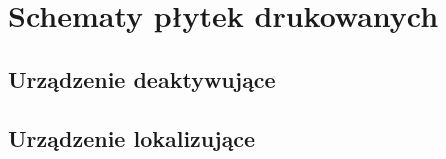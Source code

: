 \chapter{Schematy płytek drukowanych}
\label{boards}

\section{Urządzenie deaktywujące}

\section{Urządzenie lokalizujące}
